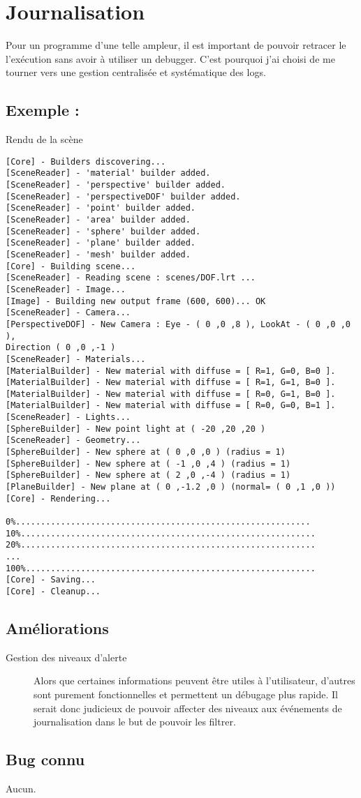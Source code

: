 \section{Journalisation}
Pour un programme d'une telle ampleur, il est important de pouvoir retracer le
l'exécution sans avoir à utiliser un debugger. C'est pourquoi j'ai choisi de
me tourner vers une gestion centralisée et systématique des logs.

\subsection{Exemple :} Rendu de la scène  
\begin{center}
\begin{verbatim}
[Core] - Builders discovering...
[SceneReader] - 'material' builder added.
[SceneReader] - 'perspective' builder added.
[SceneReader] - 'perspectiveDOF' builder added.
[SceneReader] - 'point' builder added.
[SceneReader] - 'area' builder added.
[SceneReader] - 'sphere' builder added.
[SceneReader] - 'plane' builder added.
[SceneReader] - 'mesh' builder added.
[Core] - Building scene...
[SceneReader] - Reading scene : scenes/DOF.lrt ...
[SceneReader] - Image...
[Image] - Building new output frame (600, 600)... OK
[SceneReader] - Camera...
[PerspectiveDOF] - New Camera : Eye - ( 0 ,0 ,8 ), LookAt - ( 0 ,0 ,0 ),
Direction ( 0 ,0 ,-1 )
[SceneReader] - Materials...
[MaterialBuilder] - New material with diffuse = [ R=1, G=0, B=0 ].
[MaterialBuilder] - New material with diffuse = [ R=1, G=1, B=0 ].
[MaterialBuilder] - New material with diffuse = [ R=0, G=1, B=0 ].
[MaterialBuilder] - New material with diffuse = [ R=0, G=0, B=1 ].
[SceneReader] - Lights...
[SphereBuilder] - New point light at ( -20 ,20 ,20 )
[SceneReader] - Geometry...
[SphereBuilder] - New sphere at ( 0 ,0 ,0 ) (radius = 1)
[SphereBuilder] - New sphere at ( -1 ,0 ,4 ) (radius = 1)
[SphereBuilder] - New sphere at ( 2 ,0 ,-4 ) (radius = 1)
[PlaneBuilder] - New plane at ( 0 ,-1.2 ,0 ) (normal= ( 0 ,1 ,0 ))
[Core] - Rendering...

0%...........................................................
10%...........................................................
20%...........................................................
...
100%..........................................................
[Core] - Saving...
[Core] - Cleanup...
\end{verbatim}
\end{center}

\subsection{Améliorations}
\begin{description}
  \item [Gestion des niveaux d'alerte] Alors que certaines informations
    peuvent être utiles à l'utilisateur, d'autres sont purement fonctionnelles
    et permettent un débugage plus rapide. Il serait donc judicieux de pouvoir
    affecter des niveaux aux événements de journalisation dans le but de
    pouvoir les filtrer.
\end{description}

\subsection{Bug connu} 
Aucun.
